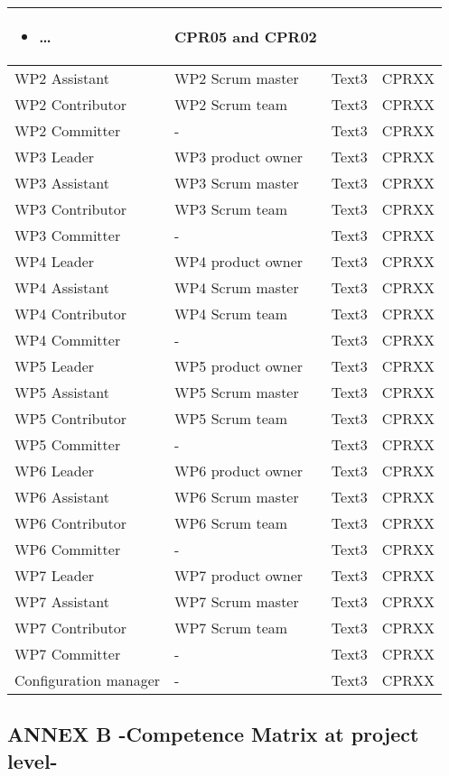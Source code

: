 \documentclass{template/openetcs_article}
\begin{document}
\begin{flushleft}
\begin{supertabular}{|m{2cm}|m{2cm}|m{9cm}|m{2cm}|}
\begin{itemize}
\item {\dots}
\end{itemize} &
CPR05 and CPR02\\\hline
WP2 Assistant &
WP2 Scrum master &
Text3 &
CPRXX\\\hline
WP2 Contributor &
WP2 Scrum team   &
Text3 &
CPRXX\\\hline
WP2 Committer &
- &
Text3 &
CPRXX\\\hline
WP3 Leader &
WP3 product owner &
Text3 &
CPRXX\\\hline
WP3 Assistant &
WP3 Scrum master &
Text3 &
CPRXX\\\hline
WP3 Contributor &
WP3 Scrum team  &
Text3 &
CPRXX\\\hline
WP3 Committer &
- &
Text3 &
CPRXX\\\hline
WP4 Leader &
WP4 product owner &
Text3 &
CPRXX\\\hline
WP4 Assistant &
WP4 Scrum master &
Text3 &
CPRXX\\\hline
WP4 Contributor &
WP4 Scrum team  &
Text3 &
CPRXX\\\hline
WP4 Committer &
- &
Text3 &
CPRXX\\\hline
WP5 Leader &
WP5 product owner &
Text3 &
CPRXX\\\hline
WP5 Assistant &
WP5 Scrum master &
Text3 &
CPRXX\\\hline
WP5 Contributor &
WP5 Scrum team  &
Text3 &
CPRXX\\\hline
WP5 Committer &
- &
Text3 &
CPRXX\\\hline
WP6 Leader &
WP6 product owner &
Text3 &
CPRXX\\\hline
WP6 Assistant &
WP6 Scrum master &
Text3 &
CPRXX\\\hline
WP6 Contributor &
WP6 Scrum team  &
Text3 &
CPRXX\\\hline
WP6 Committer &
- &
Text3 &
CPRXX\\\hline
WP7 Leader &
WP7 product owner &
Text3 &
CPRXX\\\hline
WP7 Assistant &
WP7 Scrum master &
Text3 &
CPRXX\\\hline
WP7 Contributor &
WP7 Scrum team  &
Text3 &
CPRXX\\\hline
WP7 Committer &
- &
Text3 &
CPRXX\\\hline
Configuration manager &
- &
Text3 &
CPRXX\\\hline
\end{supertabular}
\end{flushleft}

\subsection{ANNEX B -Competence Matrix at project level-}
\end{document}
